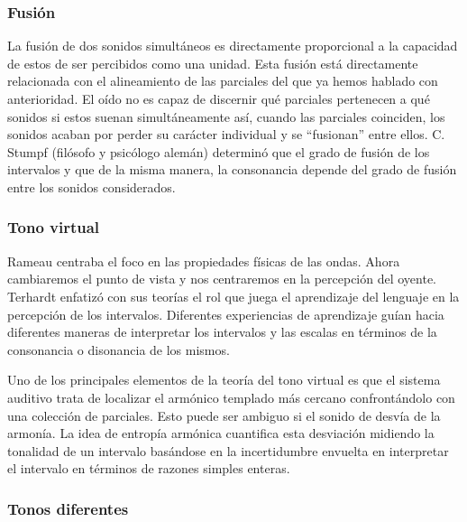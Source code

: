 \documentclass[11pt,a4paper]{article}
\begin{document}
	\subsubsection{Fusión}
	
	La fusión de dos sonidos simultáneos es directamente proporcional a la capacidad de estos de ser percibidos como una unidad. Esta fusión está directamente relacionada con el alineamiento de las parciales del que ya hemos hablado con anterioridad. El oído no es capaz de discernir qué parciales pertenecen a qué sonidos si estos suenan simultáneamente así, cuando las parciales coinciden, los sonidos acaban por perder su carácter individual y se ``fusionan'' entre ellos.  C. Stumpf (filósofo y psicólogo alemán) determinó que el grado de fusión de los intervalos y que de la misma manera, la consonancia depende del grado de fusión entre los sonidos considerados.
	
	\subsubsection{Tono virtual}
	
	Rameau centraba el foco en las propiedades físicas de las ondas. Ahora cambiaremos el punto de vista y nos centraremos en la percepción del oyente. Terhardt enfatizó con sus teorías el rol que juega el aprendizaje del lenguaje en la percepción de los intervalos. Diferentes experiencias de aprendizaje guían hacia diferentes maneras de interpretar los intervalos y las escalas en términos de la consonancia o disonancia de los mismos.
	
	Uno de los principales elementos de la teoría del tono virtual es que el sistema auditivo trata de localizar el armónico templado más cercano confrontándolo con una colección de parciales. Esto puede ser ambiguo si el sonido de desvía de la armonía. La idea de entropía armónica cuantifica esta desviación midiendo la tonalidad de un intervalo basándose en la incertidumbre envuelta en interpretar el intervalo en términos de razones simples enteras.
	
	\subsubsection{Tonos diferentes}
	
\end{document}
